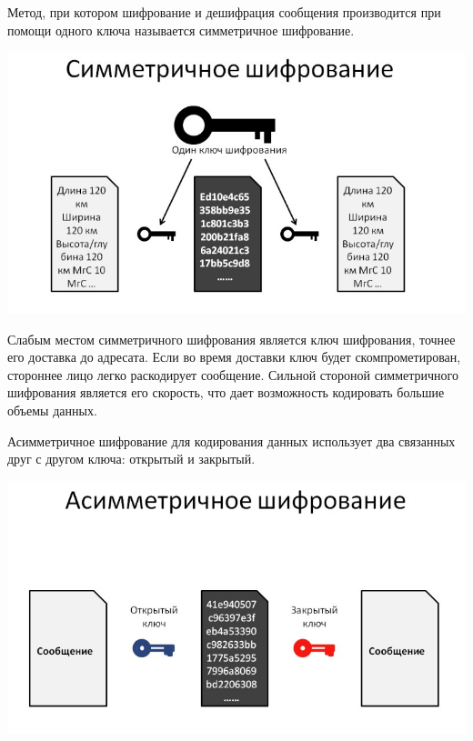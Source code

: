 \documentclass[12pt]{article}
\begin{document}
		\vspace{0.5cm}
		
		Метод, при котором шифрование и дешифрация сообщения производится при помощи одного ключа называется симметричное шифрование.
		
		 \begin{center}
			\includegraphics[width=1\linewidth]{pictures/img2.jpg}
		\end{center}
	
	\vspace{0.5cm}
	
	Слабым местом симметричного шифрования является ключ шифрования, точнее его доставка до адресата. Если во время доставки ключ будет скомпрометирован, стороннее лицо легко раскодирует сообщение. Сильной стороной симметричного шифрования является его скорость, что дает возможность кодировать большие объемы данных.
	
	\vspace{0.5cm}
	
	Асимметричное шифрование для кодирования данных использует два связанных друг с другом ключа: открытый и закрытый.
	
	\begin{center}
		\includegraphics[width=1\linewidth]{pictures/img3.jpg}
	\end{center}
	
\end{document}
